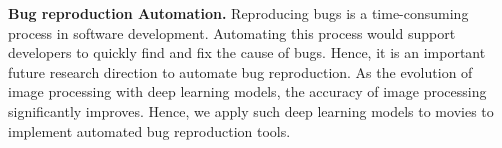 \noindent
\textbf{Bug reproduction Automation.}
Reproducing bugs is a time-consuming process 
in software development.
Automating this process would support developers 
to quickly find and fix the cause of bugs. 
Hence, it is an important future research direction 
to automate bug reproduction. 
As the evolution of image processing with deep learning models, 
the accuracy of image processing significantly improves. 
Hence, we apply such deep learning models to movies 
to implement automated bug reproduction tools. 





%  

